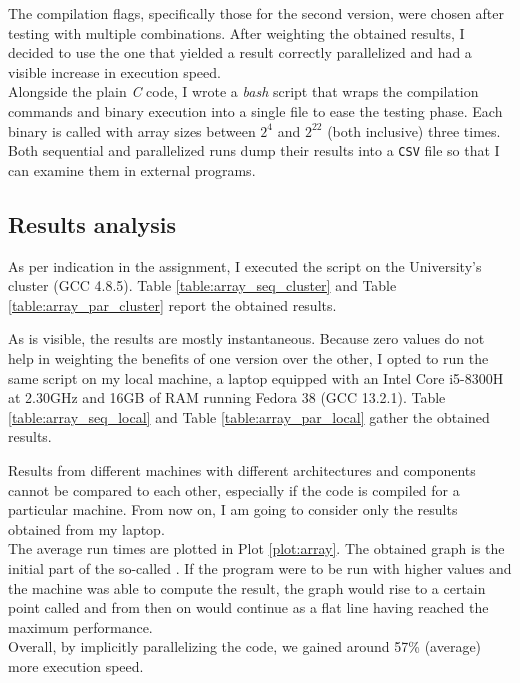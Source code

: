 The compilation flags, specifically those for the second version, were chosen after testing with multiple combinations. %
After weighting the obtained results, I decided to use the one that yielded a result correctly parallelized and had a visible %
increase in execution speed.\\
Alongside the plain \textit{C} code, I wrote a \textit{bash} script that wraps the compilation commands and binary execution %
into a single file to ease the testing phase. Each binary is called with array sizes between $2^4$ and $2^{22}$ (both inclusive) %
three times. Both sequential and parallelized runs dump their results into a \texttt{CSV} file so that I can examine %
them in external programs.%

\subsection*{Results analysis}
As per indication in the assignment, I executed the script on the University's cluster (GCC 4.8.5). Table %
\ref{table:array_seq_cluster} and Table \ref{table:array_par_cluster} report the obtained results.%

\begin{table}[h!tb]
    \centering
    \parbox{.45\linewidth}{
    }
    \parbox{.50\linewidth}{
    }
\end{table}

As is visible, the results are mostly instantaneous. Because zero values do not help in weighting the benefits of %
one version over the other, I opted to run the same script on my local machine, a laptop equipped with an Intel%
\textsuperscript{\textregistered} Core\textsuperscript{\texttrademark} i5-8300H at 2.30GHz and 16GB of RAM running Fedora %
38 (GCC 13.2.1). Table \ref{table:array_seq_local} and Table \ref{table:array_par_local} gather the obtained results.

\begin{table}[h!tb]
    \centering
    \parbox{.45\linewidth}{
    }
    \parbox{.50\linewidth}{
    }
\end{table}

Results from different machines with different architectures and components cannot be compared to each other, especially %
if the code is compiled for a particular machine. From now on, I am going to consider only the results obtained from my laptop.\\%
The average run times are plotted in Plot \ref{plot:array}. The obtained graph is the initial part of the so-called %
. If the program were to be run with higher values and the machine was able to compute the result, 
the graph would rise to a certain point called  and from then on would continue as a flat line having reached %
the maximum performance.\\%
Overall, by implicitly parallelizing the code, we gained around 57\% (average) more execution speed.%
